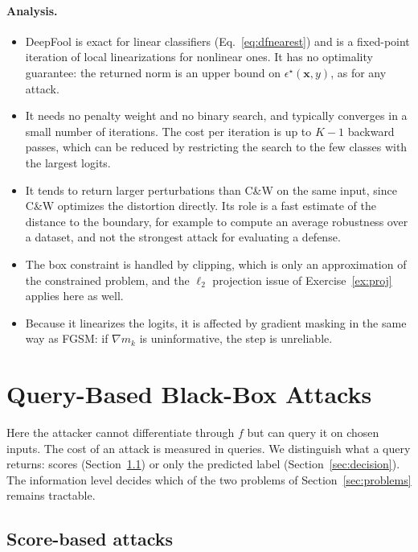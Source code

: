 \documentclass[10pt,a4paper]{extarticle}
\theoremstyle{definition}
\newcommand{\x}{\mathbf{x}}
\begin{document}
\paragraph{Analysis.}
\begin{itemize}
  \item DeepFool is exact for linear classifiers (Eq.~\ref{eq:dfnearest}) and is a fixed-point iteration of local linearizations for nonlinear ones. It has no optimality guarantee: the returned norm is an upper bound on \(\epsilon^\star(\x,y)\), as for any attack.
  \item It needs no penalty weight and no binary search, and typically converges in a small number of iterations. The cost per iteration is up to \(K-1\) backward passes, which can be reduced by restricting the search to the few classes with the largest logits.
  \item It tends to return larger perturbations than C\&W on the same input, since C\&W optimizes the distortion directly. Its role is a fast estimate of the distance to the boundary, for example to compute an average robustness over a dataset, and not the strongest attack for evaluating a defense.
  \item The box constraint is handled by clipping, which is only an approximation of the constrained problem, and the \(\ell_2\) projection issue of Exercise~\ref{ex:proj} applies here as well.
  \item Because it linearizes the logits, it is affected by gradient masking in the same way as FGSM: if \(\nabla m_k\) is uninformative, the step is unreliable.
\end{itemize}

\section{Query-Based Black-Box Attacks}\label{sec:query}

Here the attacker cannot differentiate through \(f\) but can query it on chosen inputs. The cost of an attack is measured in queries. We distinguish what a query returns: scores (Section~\ref{sec:score}) or only the predicted label (Section~\ref{sec:decision}). The information level decides which of the two problems of Section~\ref{sec:problems} remains tractable.

\subsection{Score-based attacks}\label{sec:score}
\end{document}

